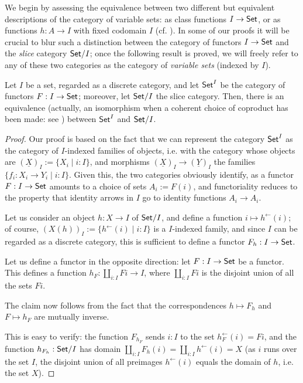 We begin by assessing the equivalence between two different but equivalent descriptions of the category of variable sets: as class functions $I \to \mathsf{Set}$, or as functions $h : A \to I$ with fixed codomain $I$ (cf. \cite[1.6.1]{Bor1}). In some of our proofs it will be crucial to blur such a distinction between the category of functors $I \to \mathsf{Set}$ and the \emph{slice} category $\mathsf{Set}/I$; once the following result is proved, we will freely refer to any of these two categories as the category of \emph{variable sets} (indexed by $I$).
\begin{proposition}\label{variabbo_set}
	Let $I$ be a set, regarded as a discrete category, and let $\mathsf{Set}^I$ be the category of functors $F : I \to \mathsf{Set}$; moreover, let $\mathsf{Set}/I$ the slice category. Then, there is an equivalence (actually, an isomorphism when a coherent choice of coproduct has been made: see \cite[1.5.1]{Bor1}) between $\mathsf{Set}^I$ and $\mathsf{Set}/I$.
\end{proposition}
\begin{proof}
	Our proof is based on the fact that we can represent the category $\mathsf{Set}^I$ as the category of $I$-indexed families of objects, i.e. with the category whose objects are $(\underline X)_I := \{X_i\mid i: I\}$, and morphisms $(\underline X)_I\to (\underline Y)_I$ the families $\{f_i : X_i \to Y_i\mid i : I\}$. Given this, the two categories obviously identify, as a functor $F : I \to \mathsf{Set}$ amounts to a choice of sets $A_i := F(i)$, and functoriality reduces to the property that identity arrows in $I$ go to identity functions $A_i \to A_i$.

	Let us consider an object $h : X\to I$ of $\mathsf{Set}/I$, and define a function $i\mapsto h^\leftarrow(i)$; of course, $(X(h))_I := \{h^\leftarrow(i) \mid i : I\}$ is a $I$-indexed family, and since $I$ can be regarded as a discrete category, this is sufficient to define a functor $F_h : I \to \mathsf{Set}$.

	Let us define a functor in the opposite direction: let $F : I \to \mathsf{Set}$ be a functor. This defines a function $h_F : \coprod_{i: I}Fi \to I$, where $\coprod_{i: I} Fi$ is the disjoint union of all the sets $Fi$.

	The claim now follows from the fact that the correspondences $h\mapsto F_h$ and $F\mapsto h_F$ are mutually inverse.

	This is easy to verify: the function $F_{h_F}$ sends $i: I$ to the set $h_F^\leftarrow(i)=Fi$, and the function $h_{F_h} : \mathsf{Set}/I$ has domain $\coprod_{i: I}F_h(i) = \coprod_{i: I}h^\leftarrow(i)=X$ (as $i$ runs over the set $I$, the disjoint union of all preimages $h^\leftarrow(i)$ equals the domain of $h$, i.e. the set $X$).
\end{proof}
